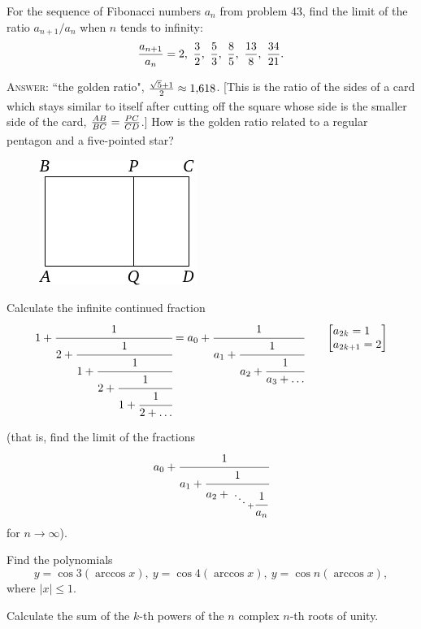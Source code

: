\documentclass[12pt]{article}  %
\begin{document}
\bigskip
{} For the sequence of Fibonacci numbers $a_n$ from problem 43, find the limit of the ratio 
$a_{n+1}/a_n$ when $n$ tends to infinity:\vspace{2\jot}
\[
\frac{a_{n+1}}{a_n}=2,\ \frac 32,\ \frac53, \ \frac85, \ \frac{13}8,
\ \frac{34}{21}.
\vspace{\jot}
\] 

\textsc{Answer:} ``the golden ratio",
$\frac{\sqrt{5}+1}{2\vphantom)} \approx 1{,}618$. [This is the ratio of the sides of a card which stays
similar to itself after cutting off the square whose side is the smaller side of the card,
  $\frac{AB}{BC}=\frac{PC}{CD\vphantom)}$.] How is the golden ratio related to a regular pentagon and a five-pointed star? 

\begin{figure}[h]
\centering
 \includegraphics{taskbook-37}
\end{figure}

\newpage
{} Calculate the infinite continued fraction
\begin{align*}
1+\cfrac{1}{2+\cfrac{1}{1+\cfrac{1}{2+\cfrac{1}{1+\cfrac{1}{2+\ldots}}}}}=
a_0+\cfrac{1}{a_1+\cfrac{1}{a_2+\cfrac{1}{a_3+\dots}}} \qquad
\smash{
{\left[\begin{aligned} &a_{2k}=1 \\[-\jot] &a_{2k+1}
      =2 \end{aligned}\right]} }
\end{align*}

\medskip

\noindent (that is, find the limit of the fractions
$$
a_0+\cfrac{1}{a_1+\cfrac{1}{a_2+{\atop{\ddots \atop {}} + \cfrac{1}{a_n}}
} 
}
$$
for $n \to \infty$).


\bigskip
{} Find the polynomials 
\[
y=\cos 3 (\arccos x),\  y=\cos 4 (\arccos x),\ 
y=\cos n (\arccos x),
\] 
where $|x| \leqslant 1$. 


\bigskip
{} Calculate the sum of the $k$-th powers of the $n$ complex  $n$-th roots of unity.  
 
\end{document}
